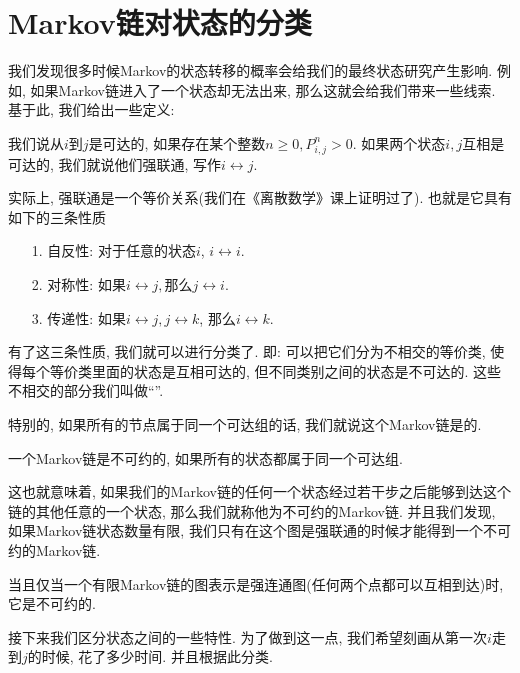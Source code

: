 \section{Markov链对状态的分类}

我们发现很多时候Markov的状态转移的概率会给我们的最终状态研究产生影响. 例如, 如果Markov链进入了一个状态却无法出来, 那么这就会给我们带来一些线索. 基于此, 我们给出一些定义: 

\begin{definition}
    我们说从$i$到$j$是可达的, 如果存在某个整数$n\geq 0,P_{i,j}^n>0$. 如果两个状态$i,j$互相是可达的, 我们就说他们强联通, 写作$i \leftrightarrow j$. 
\end{definition}

实际上, 强联通是一个等价关系(我们在《离散数学》课上证明过了). 也就是它具有如下的三条性质
\begin{itemize}
    \item [1.] 自反性: 对于任意的状态$i$, $i\leftrightarrow i$.
    \item [2.] 对称性: 如果$i\leftrightarrow j, $那么$j\leftrightarrow i$.
    \item [3.] 传递性: 如果$i\leftrightarrow j, j\leftrightarrow k$, 那么$i\leftrightarrow k$. 
\end{itemize}

有了这三条性质, 我们就可以进行分类了. 即: 可以把它们分为不相交的等价类, 使得每个等价类里面的状态是互相可达的, 但不同类别之间的状态是不可达的. 这些不相交的部分我们叫做``''. 

特别的, 如果所有的节点属于同一个可达组的话, 我们就说这个Markov链是的. 

\begin{definition}
    一个Markov链是不可约的, 如果所有的状态都属于同一个可达组. 
\end{definition}

这也就意味着, 如果我们的Markov链的任何一个状态经过若干步之后能够到达这个链的其他任意的一个状态, 那么我们就称他为不可约的Markov链. 并且我们发现, 如果Markov链状态数量有限, 我们只有在这个图是强联通的时候才能得到一个不可约的Markov链. 

\begin{lemma}
    当且仅当一个有限Markov链的图表示是强连通图(任何两个点都可以互相到达)时, 它是不可约的. 
\end{lemma}

接下来我们区分状态之间的一些特性. 为了做到这一点, 我们希望刻画从第一次$i$走到$j$的时候, 花了多少时间. 并且根据此分类. 

